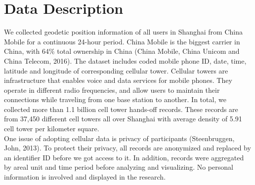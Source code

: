 \documentclass[hidelinks,12pt]{article}
\begin{document}
	\section{Data Description}\label{sec:data}
We collected geodetic position information of all users in Shanghai from China Mobile for a continuous 24-hour period. China Mobile is the biggest carrier in China, with 64\% total ownership in China (China Mobile, China Unicom and China Telecom, 2016). The dataset includes coded mobile phone ID, date, time, latitude and longitude of corresponding cellular tower. Cellular towers are infrastructure that enables voice and data services for mobile phones. They operate in different radio frequencies, and allow users to maintain their connections while traveling from one base station to another. In total, we collected more than 1.1 billion cell tower hands-off records. These records are from 37,450 different cell towers all over Shanghai with average density of 5.91 cell tower per kilometer square.\\

One issue of adopting cellular data is privacy of participants (Steenbruggen, John, 2013). To protect their privacy, all records are anonymized and replaced by an identifier ID before we got access to it. In addition, records were aggregated by areal unit and time period before analyzing and visualizing. No personal information is involved and displayed in the research.\\
\end{document}
